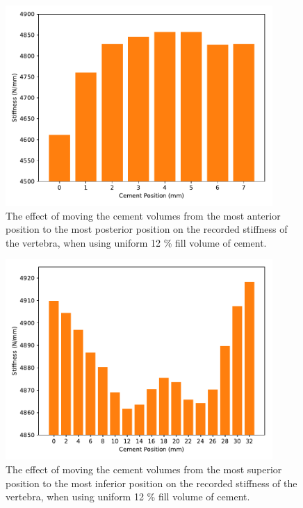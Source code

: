 \begin{figure}[ht!]

\centering
\includegraphics[width=4in]{images/xaxis_mv_cmt.pdf}
\caption{The effect of moving the cement volumes from the most anterior position to the most posterior position on the recorded stiffness of the vertebra, when using uniform 12 \% fill volume of cement. }
	\label{fig:xaxis_mv_cmt}
\end{figure}

\begin{figure}[ht!]

\centering
\includegraphics[width=4in]{images/yaxis_mv_cmt.pdf}
\caption{The effect of moving the cement volumes from the most superior position to the most inferior position on the recorded stiffness of the vertebra, when using uniform 12 \% fill volume of cement. }
	\label{fig:yaxis_mv_cmt}
\end{figure}

